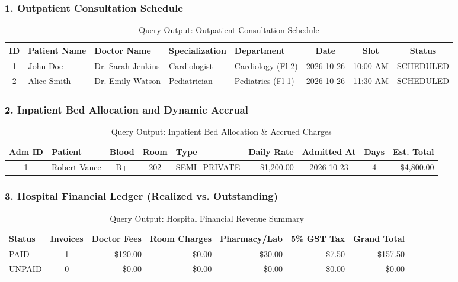 \documentclass[12pt,a4paper]{article}
\begin{document}
\subsubsection{1. Outpatient Consultation Schedule}
\begin{table}[H]
\centering
\small
\caption{Query Output: Outpatient Consultation Schedule}
\vspace{0.15cm}
\begin{tabularx}{\textwidth}{|c|l|l|l|l|c|c|c|}
\hline
\textbf{ID} & \textbf{Patient Name} & \textbf{Doctor Name} & \textbf{Specialization} & \textbf{Department} & \textbf{Date} & \textbf{Slot} & \textbf{Status} \\
\hline
1 & John Doe & Dr. Sarah Jenkins & Cardiologist & Cardiology (Fl 2) & 2026-10-26 & 10:00 AM & SCHEDULED \\
\hline
2 & Alice Smith & Dr. Emily Watson & Pediatrician & Pediatrics (Fl 1) & 2026-10-26 & 11:30 AM & SCHEDULED \\
\hline
\end{tabularx}
\end{table}

\subsubsection{2. Inpatient Bed Allocation and Dynamic Accrual}
\begin{table}[H]
\centering
\small
\caption{Query Output: Inpatient Bed Allocation \& Accrued Charges}
\vspace{0.15cm}
\begin{tabularx}{\textwidth}{|c|l|c|c|l|r|c|c|r|}
\hline
\textbf{Adm ID} & \textbf{Patient} & \textbf{Blood} & \textbf{Room} & \textbf{Type} & \textbf{Daily Rate} & \textbf{Admitted At} & \textbf{Days} & \textbf{Est. Total} \\
\hline
1 & Robert Vance & B+ & 202 & SEMI\_PRIVATE & \$1,200.00 & 2026-10-23 & 4 & \$4,800.00 \\
\hline
\end{tabularx}
\end{table}

\subsubsection{3. Hospital Financial Ledger (Realized vs. Outstanding)}
\begin{table}[H]
\centering
\small
\caption{Query Output: Hospital Financial Revenue Summary}
\vspace{0.15cm}
\begin{tabularx}{\textwidth}{|l|c|r|r|r|r|r|}
\hline
\textbf{Status} & \textbf{Invoices} & \textbf{Doctor Fees} & \textbf{Room Charges} & \textbf{Pharmacy/Lab} & \textbf{5\% GST Tax} & \textbf{Grand Total} \\
\hline
PAID   & 1 & \$120.00 & \$0.00 & \$30.00 & \$7.50 & \$157.50 \\
\hline
UNPAID & 0 & \$0.00   & \$0.00 & \$0.00  & \$0.00 & \$0.00   \\
\hline
\end{tabularx}
\end{table}
\end{document}
